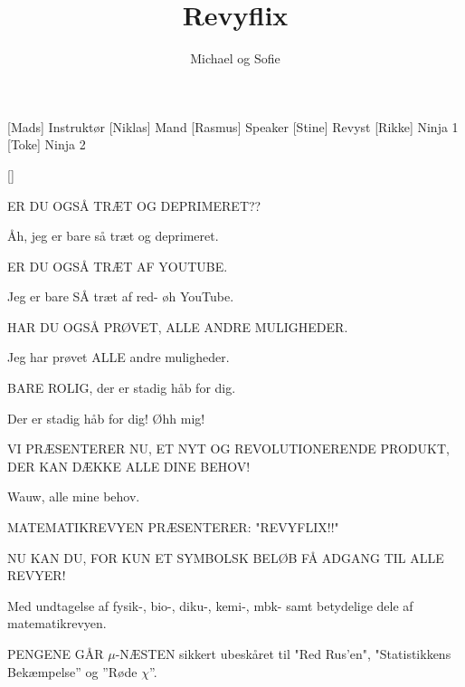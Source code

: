 \documentclass[a4paper,11pt]{article}
\title{Revyflix}
\author{Michael og Sofie}
\begin{document}
\maketitle

\begin{roles}
[Mads] Instruktør
[Niklas] Mand
[Rasmus] Speaker
[Stine] Revyst
[Rikke] Ninja 1
[Toke] Ninja 2
\end{roles}

\begin{props}
[]
\end{props}
  
\begin{sketch}

 ER DU OGSÅ TRÆT OG DEPRIMERET??

 Åh, jeg er bare så træt og deprimeret.

 ER DU OGSÅ TRÆT AF YOUTUBE.

 Jeg er bare SÅ træt af red- øh YouTube.

 HAR DU OGSÅ PRØVET, ALLE ANDRE MULIGHEDER.

 Jeg har prøvet ALLE andre muligheder.

 BARE ROLIG, der er stadig håb for dig.

 Der er stadig håb for dig! Øhh mig!

 VI PRÆSENTERER NU, ET NYT OG REVOLUTIONERENDE PRODUKT, DER KAN DÆKKE ALLE DINE BEHOV!

 Wauw, alle mine behov.

 MATEMATIKREVYEN  PRÆSENTERER: "REVYFLIX!!"


 NU KAN DU, FOR KUN ET SYMBOLSK BELØB FÅ ADGANG TIL ALLE REVYER!



 Med undtagelse af fysik-, bio-, diku-, kemi-, mbk- samt betydelige dele af matematikrevyen.

 PENGENE GÅR $\mu$-NÆSTEN sikkert ubeskåret til "Red Rus'en", "Statistikkens Bekæmpelse” og ”Røde $\chi$”.



\end{sketch}
\end{document}

